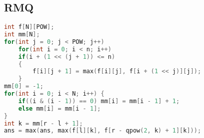 ﻿\subsection{RMQ}
	\begin{lstlisting}[language=C++]
int f[N][POW];
int mm[N];
for(int j = 0; j < POW; j++)
    for(int i = 0; i < n; i++)
    if(i + (1 << (j + 1)) <= n)
    {
        f[i][j + 1] = max(f[i][j], f[i + (1 << j)][j]);
    }
mm[0] = -1;
for(int i = 0; i < N; i++) {
	if((i & (i - 1)) == 0) mm[i] = mm[i - 1] + 1;
	else mm[i] = mm[i - 1];
}
int k = mm[r - l + 1];
ans = max(ans, max(f[l][k], f[r - qpow(2, k) + 1][k]));	  	
	\end{lstlisting}
